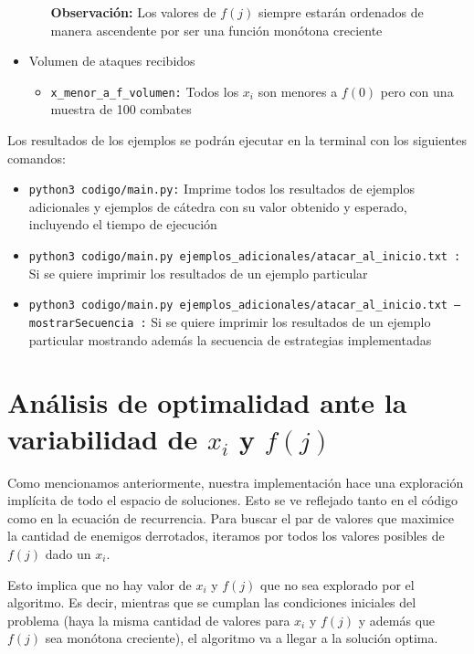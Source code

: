 \documentclass{article}
\begin{document}
\begin{itemize}
\begin{itemize}
        \textbf{Observación: }Los valores de $f(j)$ siempre estarán ordenados de manera ascendente por ser una función monótona creciente
    \end{itemize}
    \item Volumen de ataques recibidos
    \begin{itemize}
        \item \texttt{x\_menor\_a\_f\_volumen:} Todos los $x_i$ son menores a $f(0)$ pero con una muestra de 100 combates
    \end{itemize}
\end{itemize}

Los resultados de los ejemplos se podrán ejecutar en la terminal con los siguientes comandos:

\begin{itemize}
    \item \texttt{python3 codigo/main.py:} Imprime todos los resultados de ejemplos adicionales y ejemplos de cátedra con su valor obtenido y esperado, incluyendo el tiempo de ejecución
    \item \texttt{python3 codigo/main.py ejemplos\_adicionales/atacar\_al\_inicio.txt :} Si se quiere imprimir los resultados de un ejemplo particular
    \item \texttt{python3 codigo/main.py ejemplos\_adicionales/atacar\_al\_inicio.txt --mostrarSecuencia :} Si se quiere imprimir los resultados de un ejemplo particular mostrando además la secuencia de estrategias implementadas
\end{itemize}

\section{Análisis de optimalidad ante la variabilidad de $x_i$ y $f(j)$}
Como mencionamos anteriormente, nuestra implementación hace una exploración implícita de todo el espacio de soluciones. Esto se ve reflejado tanto en el código como en la ecuación de recurrencia. Para buscar el par de valores que maximice la cantidad de enemigos derrotados, iteramos por todos los valores posibles de $f(j)$ dado un $x_i$.

Esto implica que no hay valor de $x_i$ y $f(j)$ que no sea explorado por el algoritmo. Es decir, mientras que se cumplan las condiciones iniciales del problema (haya la misma cantidad de valores para $x_i$ y $f(j)$ y además que $f(j)$ sea monótona creciente), el algoritmo va a llegar a la solución optima.
\end{document}
